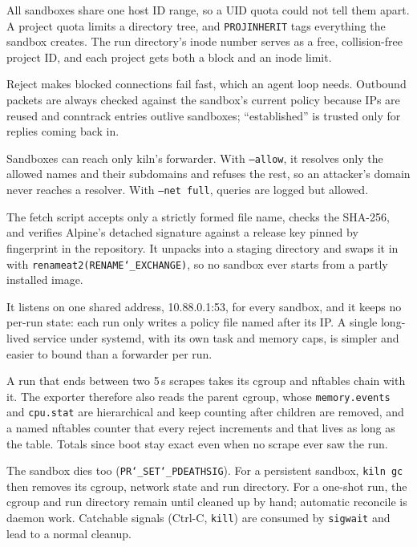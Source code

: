 \documentclass[10pt,letterpaper]{article}
\newcommand{\code}[1]{\texttt{#1}}
\newcommand{\us}{\char`\_}
\begin{document}
{All sandboxes share one host ID range, so a UID quota could not tell them apart.
A project quota limits a directory tree, and \code{PROJINHERIT} tags everything
the sandbox creates. The run directory's inode number serves as a free,
collision-free project ID, and each project gets both a block and an inode limit.}

{Reject makes blocked connections fail fast, which an agent loop needs. Outbound
packets are always checked against the sandbox's current policy because IPs are
reused and conntrack entries outlive sandboxes; ``established'' is trusted only for
replies coming back in.}

{Sandboxes can reach only kiln's forwarder. With \code{--allow}, it resolves only
the allowed names and their subdomains and refuses the rest, so an attacker's domain
never reaches a resolver. With \code{--net full}, queries are logged but allowed.}

{The fetch script accepts only a strictly formed file name, checks the SHA-256,
and verifies Alpine's detached signature against a release key pinned by
fingerprint in the repository. It unpacks into a staging directory and swaps it
in with \code{renameat2(RENAME\us{}EXCHANGE)}, so no sandbox ever starts from a
partly installed image.}

{It listens on one shared address, 10.88.0.1:53, for every sandbox, and it keeps
no per-run state: each run only writes a policy file named after its IP. A single
long-lived service under systemd, with its own task and memory caps, is simpler
and easier to bound than a forwarder per run.}


{A run that ends between two 5\,s scrapes takes its cgroup and nftables chain
with it. The exporter therefore also reads the parent cgroup, whose
\code{memory.events} and \code{cpu.stat} are hierarchical and keep counting after
children are removed, and a named nftables counter that every reject increments
and that lives as long as the table. Totals since boot stay exact even when no
scrape ever saw the run.}

{The sandbox dies too (\code{PR\us{}SET\us{}PDEATHSIG}). For a persistent
sandbox, \code{kiln gc} then removes its cgroup, network state and run directory.
For a one-shot run, the cgroup and run directory remain until cleaned up by hand;
automatic reconcile is daemon work. Catchable signals (Ctrl-C, \code{kill}) are
consumed by \code{sigwait} and lead to a normal cleanup.}
\end{document}
